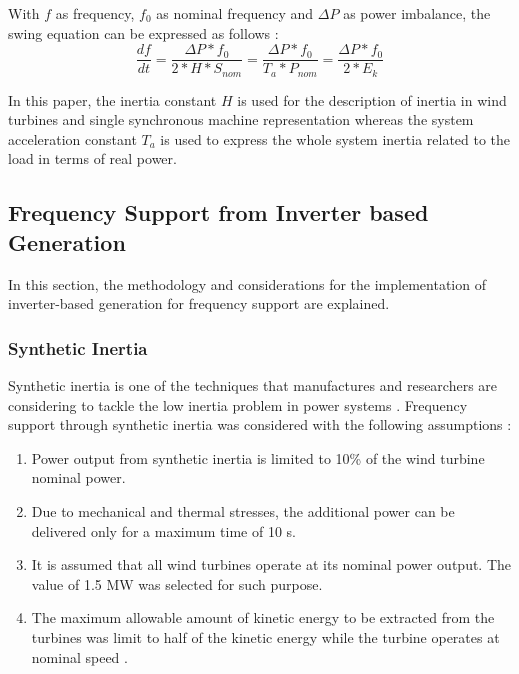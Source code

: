 With $f$ as frequency, $f_0$ as nominal frequency and $\Delta P$ as power imbalance, the swing equation can be expressed as follows \cite{kundur1994power}:
\begin{equation}
\label{eq:swing}
\frac{df}{dt}=\dfrac{\Delta P*f_0}{2*H*S_{nom}}=\frac{\Delta P*f_0}{T_a*P_{nom}}=\frac{\Delta P*f_0}{2*E_k}
\end{equation}

In this paper, the inertia constant $ H $ is used for the description of inertia in wind turbines and single synchronous machine representation whereas the system acceleration constant $ T_a $ is used to express the whole system inertia related to the load in terms of real power.

\subsection{Frequency Support from Inverter based Generation}

In this section, the methodology and considerations for the implementation of inverter-based generation for frequency support are explained.

\subsubsection{Synthetic Inertia}

Synthetic inertia is one of the techniques that manufactures and researchers are considering to tackle the low inertia problem in power systems \cite{Gevorgian.2017, GeneralElectricInternational.2013}. Frequency support through synthetic inertia was considered with the following assumptions \cite{dreidy2017inertia, nesje2015need}:
\begin{enumerate}[leftmargin=*,labelsep=4.9mm]
\item Power output from synthetic inertia is limited to 10\% of the wind turbine nominal power.
\item Due to mechanical and thermal stresses, the additional power can be delivered only for a maximum time of 10 s.
\item It is assumed that all wind turbines operate at its nominal power output. The value of 1.5 MW was selected for such purpose.
\item The maximum allowable amount of kinetic energy to be extracted from the turbines was limit to half of the kinetic energy while the turbine operates at nominal speed \cite{NREL.2012}.

\end{enumerate}

